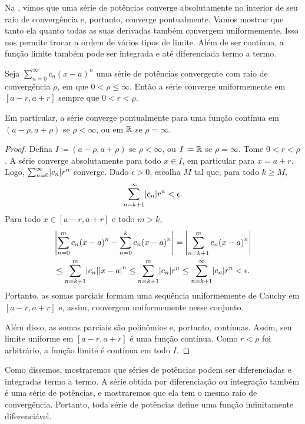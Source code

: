 Na , vimos que uma série de potências converge
absolutamente no interior de seu raio de convergência e, portanto, converge
pontualmente. Vamos mostrar que tanto ela quanto todas as suas derivadas também convergem uniformemente. Isso nos permite trocar a ordem de vários tipos de
limite. Além de ser contínua, a função limite também pode ser integrada e
até diferenciada termo a termo.

\begin{prop}
Seja $\sum_{n=0}^\infty c_n {(x-a)}^n$ uma série de potências convergente
com raio de convergência $\rho$, em que $0 < \rho \leq \infty$.
Então a série converge uniformemente em $[a-r,a+r]$ sempre que
$0 < r < \rho$.

Em particular, a série converge pontualmente para uma função contínua em
$(a-\rho,a+\rho)$ se $\rho < \infty$, ou em ${\mathbb{R}}$ se $\rho = \infty$.
\end{prop}

\begin{proof}
Defina $I \coloneqq (a-\rho,a+\rho)$ se $\rho < \infty$,
ou $I \coloneqq {\mathbb{R}}$ se $\rho= \infty$.
Tome $0 < r < \rho$.
A série converge absolutamente para todo $x \in I$, em particular para
$x = a+r$. Logo, $\sum_{n=0}^\infty \lvert {c_n} \rvert r^n$ converge.
Dado $\epsilon >0$, escolha $M$ tal que, para todo $k \geq M$,
\begin{equation*}
\sum_{n=k+1}^\infty \lvert {c_n} \rvert {r}^n < \epsilon .
\end{equation*}
Para todo $x \in [a-r,a+r]$ e todo $m > k$,
\begin{multline*}
\left\lvert {\sum_{n=0}^m c_n {(x-a)}^n - 
\sum_{n=0}^k c_n {(x-a)}^n} \right\rvert
=
\left\lvert {\sum_{n=k+1}^m c_n {(x-a)}^n} \right\rvert
\\
\leq
\sum_{n=k+1}^m \lvert {c_n} \rvert {\lvert {x-a} \rvert}^n
\leq
\sum_{n=k+1}^m \lvert {c_n} \rvert {r}^n
\leq
\sum_{n=k+1}^\infty \lvert {c_n} \rvert {r}^n
<\epsilon.
\end{multline*}
Portanto, as somas parciais formam uma sequência uniformemente de Cauchy
em $[a-r,a+r]$ e, assim, convergem uniformemente nesse conjunto.

Além disso, as somas parciais são polinômios e, portanto, contínuas. Assim,
seu limite uniforme em $[a-r,a+r]$ é uma função contínua.
Como $r < \rho$ foi arbitrário, a função limite é contínua em todo $I$.
\end{proof}

Como dissemos, mostraremos que séries de potências podem ser diferenciadas
e integradas termo a termo. A série obtida por diferenciação ou integração
também é uma série de potências, e mostraremos que ela tem o mesmo raio de
convergência. Portanto, toda série de potências define uma função
infinitamente diferenciável.

